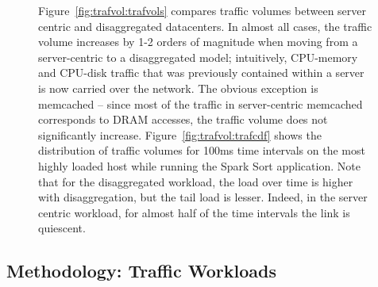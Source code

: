 %
\begin{figure}
    \centering
    \caption{\small{
    Figure~\ref{fig:trafvol:trafvols} compares traffic volumes between server centric and disaggregated datacenters. In almost all cases, the traffic volume increases by 1-2 orders of magnitude when moving from a server-centric to a disaggregated model; intuitively, CPU-memory and CPU-disk traffic that was previously contained within a server is now carried over the network. The obvious exception is memcached -- since most of the traffic in server-centric memcached corresponds to DRAM accesses, the traffic volume does not significantly increase.
    Figure~\ref{fig:trafvol:trafcdf} shows the distribution of traffic volumes for 100ms time intervals on the most highly loaded host while running the Spark Sort application. Note that for the disaggregated workload, the load over time is higher with disaggregation, but the tail load is lesser. Indeed, in the server centric workload, for almost half of the time intervals the link is quiescent.
    }}
    \label{fig:trafvol}
\end{figure}
%

\subsection{Methodology: \dis Traffic Workloads}
\label{ssec:ssmethod-traffic}

